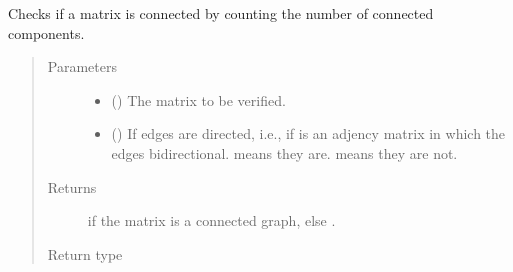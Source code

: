 \documentclass[letterpaper,10pt,english]{sphinxmanual}
\begin{document}
\begin{fulllineitems}
\label{\detokenize{app.domain.helpers:app.domain.helpers.matrices.is_connected}}
Checks if a matrix is connected by counting the number of connected
components.
\begin{quote}\begin{description}
\item[{Parameters}] \leavevmode\begin{itemize}
\item {} 
 () \textendash{} The matrix to be verified.

\item {} 
 () \textendash{} If  edges are directed, i.e., if  is an adjency
matrix in which the edges bidirectional.  means they
are.  means they are not.

\end{itemize}

\item[{Returns}] \leavevmode
{} if the matrix is a connected graph, else .

\item[{Return type}] \leavevmode
{}

\end{description}\end{quote}

\end{fulllineitems}

\end{document}
